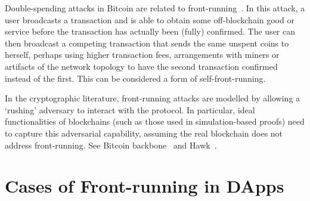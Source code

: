 



Double-spending attacks in Bitcoin are related to front-running~\cite{bamert2013have,karame2012double}. In this attack, a user broadcasts a transaction and is able to obtain some off-blockchain good or service before the transaction has actually been (fully) confirmed. The user can then broadcast a competing transaction that sends the same unspent coins to herself, perhaps using higher transaction fees, arrangements with miners or artifacts of the network topology to have the second transaction confirmed instead of the first. This can be considered a form of self-front-running.

In the cryptographic literature, front-running attacks are modelled by allowing a `rushing' adversary to interact with the protocol. In particular, ideal functionalities of blockchains (such as those used in simulation-based proofs) need to capture this adversarial capability, assuming the real blockchain does not address front-running. See \eg Bitcoin backbone~\cite{garay2015bitcoin} and Hawk~\cite{kosba2016hawk}.


\section{Cases of Front-running in DApps}


